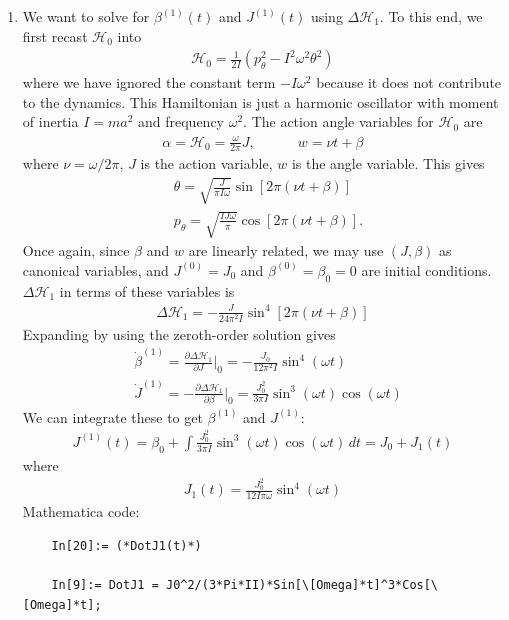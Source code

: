 \documentclass{article}
\theoremstyle{definition}
\newcommand{\p}{\partial}
\newcommand{\ham}{\mathcal{H}}
\newcommand{\al}{\alpha}
\newcommand{\be}{\beta}
\newcommand{\f}[2]{\frac{#1}{#2}}
\newcommand{\lp}{\left(}
\newcommand{\rp}{\right)}
\begin{document}
\begin{enumerate}[label=(\alph*)]
	
	\item We want to solve for $\be^{(1)}(t)$ and $J^{(1)}(t)$ using $\Delta \ham_1$. To this end, we first recast $\ham_0$ into 
	\begin{align*}
	\ham_0 = \f{1}{2I}\lp p_\theta^2 - I^2 \omega^2 \theta^2 \rp
	\end{align*}
	where we have ignored the constant term $-I\omega^2$ because it does not contribute to the dynamics.  This Hamiltonian is just a harmonic oscillator with moment of inertia $I = ma^2$ and frequency $\omega^2$. The action angle variables for $\ham_0$ are
	\begin{align*}
	\al = \ham_0 = \f{\omega}{2\pi} J ,\quad\quad\quad w = \nu t + \be
	\end{align*}
	where $\nu = \omega/2\pi$, $J$ is the action variable, $w$ is the angle variable. This gives
	\begin{align*}
	&\theta = \sqrt{\f{J}{\pi I \omega}} \sin[2\pi(\nu t + \be)] \\
	&p_\theta = \sqrt{\f{IJ\omega}{\pi}} \cos[2\pi(\nu t + \be)].
	\end{align*} 
	Once again, since $\be$ and $w$ are linearly related, we may use $(J,\be)$ as canonical variables, and $J^{(0)} = J_0$ and $\be^{(0)} = \be_0 = 0$ are initial conditions. $\Delta \ham_1$ in terms of these variables is
	\begin{align*}
	\Delta \ham_1 = -\f{J}{24\pi^2 I } \sin^4[2\pi(\nu t + \be)]
	\end{align*}
	Expanding by using the zeroth-order solution gives
	\begin{align*}
	&\dot \be^{(1)} = \f{\p \Delta \ham_1}{\p J}\bigg\vert_0 = {- \f{J_0}{12\pi^2 I } \sin^4(\omega t)}\\
	&\dot J^{(1)} = -\f{\p \Delta \ham_1}{\p \be} \bigg\vert_0 = {\f{J_0^2}{3\pi I} \sin^3(\omega t)\cos(\omega t)  }
	\end{align*}
	We can integrate these to get $\be^{(1)}$ and $J^{(1)}$:
	\begin{align*}
	J^{(1)}(t) = \be_0 + \int \f{J_0^2}{3\pi I} \sin^3(\omega t)\cos(\omega t) \,dt = \boxed{J_0 + J_1(t)}
	\end{align*}
	where
	\begin{align*}
	\boxed{J_1(t) = \f{J_0^2}{12 I \pi \omega} \sin^4 (\omega t)}
	\end{align*}
	Mathematica code:
	\begin{lstlisting}
	In[20]:= (*DotJ1(t)*)
	
	In[9]:= DotJ1 = J0^2/(3*Pi*II)*Sin[\[Omega]*t]^3*Cos[\[Omega]*t];
	

\end{lstlisting}
\end{enumerate}
\end{document}
